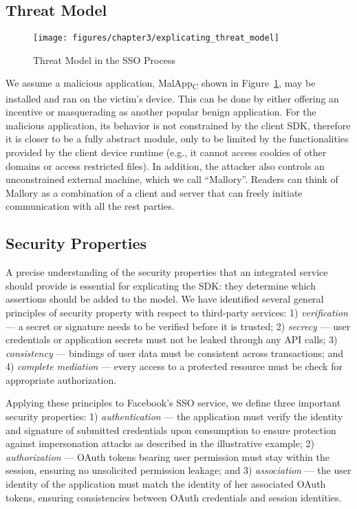 \subsection{Threat Model}

\begin{figure}[hbt]
\centering
\texttt{[image: figures/chapter3/explicating\_threat\_model]}
\caption{Threat Model in the SSO Process}
\label{fig:explicating_threat_model}
\end{figure}

We assume a malicious application, MalApp\textsubscript{C} shown in Figure~\ref{fig:explicating_threat_model}, may be installed and ran on the victim's device.  This can be done by either offering an incentive or masquerading as another popular benign application.  For the malicious application, its behavior is not constrained by the client SDK, therefore it is closer to be a fully abstract module, only to be limited by the functionalities provided by the client device runtime (e.g., it cannot access cookies of other domains or access restricted files).  In addition, the attacker also controls an unconstrained external machine, which we call ``Mallory''. Readers can think of Mallory as a combination of a client and server that can freely initiate communication with all the rest parties. 

\subsection{Security Properties}
\label{sec:security_properties}
A precise understanding of the security properties that an integrated service should provide is essential for explicating the SDK: they determine which assertions should be added to the model.  We have identified several general principles of security property with respect to third-party services: 1) \emph{verification} --- a secret or signature needs to be verified before it is trusted; 2) \emph{secrecy} --- user credentials or application secrets must not be leaked through any API calls; 3) \emph{consistency} --- bindings of user data must be consistent across transactions; and 4) \emph{complete mediation} --- every access to a protected resource must be check for appropriate authorization.  

Applying these principles to Facebook's SSO service, we define three important security properties: 1) \emph{authentication}
--- the application must verify the identity and signature of submitted credentials upon consumption to ensure protection against impersonation attacks as described in the illustrative example; 2) \emph{authorization} --- OAuth tokens bearing user
permission must stay within the session, ensuring no unsolicited permission leakage; and 3) \emph{association} --- the user identity of the application must match the identity of her associated OAuth tokens, ensuring consistencies between OAuth credentials and session identities.

